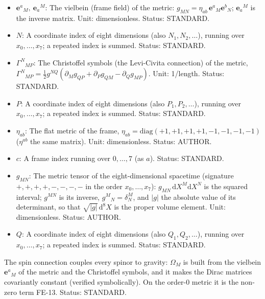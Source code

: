 \documentclass[
  10pt,
]{article}
\begin{document}
\begin{itemize}
  the Clifford algebra of signature \((4, 4)\);
  \(\gamma^M = \mathbf{e}_a{}^M\gamma^a\) along a coordinate
  (\(\gamma^{x_0}\), \(\gamma^{x_4}\), \ldots{} the matrices along
  \(x_0\), \(x_4\), \ldots), \(\gamma_M = g_{MN}\gamma^N\);
  \(\gamma^\mu\) the matrices of the four observable directions in
  four-dimensional formulas. Unit: dimensionless. Status: AUTHOR.
\item
  \(\mathbf{e}^a{}_M,\ \mathbf{e}_a{}^M\): The vielbein (frame field) of
  the metric: \(g_{MN} = \eta_{ab}\,\mathbf{e}^a{}_M\mathbf{e}^b{}_N\);
  \(\mathbf{e}_a{}^M\) is the inverse matrix. Unit: dimensionless.
  Status: STANDARD.
\item
  \(N\): A coordinate index of eight dimensions (also
  \(N_1, N_2, \dots\)), running over \(x_0, \dots, x_7\); a repeated
  index is summed. Status: STANDARD.
\item
  \(\Gamma^N{}_{MP}\): The Christoffel symbols (the Levi-Civita
  connection) of the metric,
  \(\Gamma^N{}_{MP} = \frac12 g^{NQ}(\partial_Mg_{QP} + \partial_Pg_{QM} - \partial_Qg_{MP})\).
  Unit: 1/length. Status: STANDARD.
\item
  \(P\): A coordinate index of eight dimensions (also
  \(P_1, P_2, \dots\)), running over \(x_0, \dots, x_7\); a repeated
  index is summed. Status: STANDARD.
\item
  \(\eta_{ab}\): The flat metric of the frame,
  \(\eta_{ab} = \mathrm{diag}(+1, +1, +1, +1, -1, -1, -1, -1)\)
  (\(\eta^{ab}\) the same matrix). Unit: dimensionless. Status: AUTHOR.
\item
  \(c\): A frame index running over \(0, \dots, 7\) (as \(a\)). Status:
  STANDARD.
\item
  \(g_{MN}\): The metric tensor of the eight-dimensional spacetime
  (signature \(+,+,+,+,-,-,-,-\) in the order \(x_0, \dots, x_7\)):
  \(g_{MN}\,\mathrm{d}X^M\mathrm{d}X^N\) is the squared interval;
  \(g^{MN}\) is its inverse, \(g^M{}_N = \delta^M_N\), and
  \(\lvert g\rvert\) the absolute value of its determinant, so that
  \(\sqrt{\lvert g\rvert}\,\mathrm{d}^8X\) is the proper volume element.
  Unit: dimensionless. Status: AUTHOR.
\item
  \(Q\): A coordinate index of eight dimensions (also
  \(Q_1, Q_2, \dots\)), running over \(x_0, \dots, x_7\); a repeated
  index is summed. Status: STANDARD.
\end{itemize}

The spin connection couples every spinor to gravity: \(\Omega_M\) is
built from the vielbein \(\mathbf{e}^a{}_M\) of the metric and the
Christoffel symbols, and it makes the Dirac matrices covariantly
constant (verified symbolically). On the order-0 metric it is the
non-zero term FE-13. Status: STANDARD.
\end{document}
